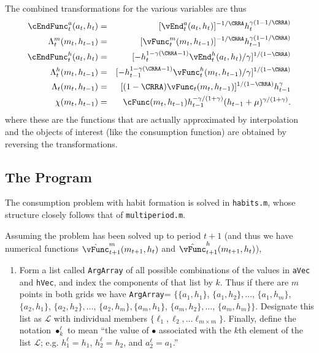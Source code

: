 \documentclass[titlepage]{\econtex}
\begin{document}
{The combined transformations for the various variables are thus
\begin{eqnarray}
        \cEndFunc_{t}^{{a}}({a}_{t},h_{t})       & = & [\vEnd_{t}^{{a}}({a}_{t},h_{t})]^{-1/\CRRA} h_{t}^{\gamma(1-1/\CRRA)} \label{eq:vEndstransform} \\
        \Lambda_{t}^{m}({m}_{t},h_{t-1})  & = & [{\vFunc}_{t}^{m}({m}_{t},h_{t-1})]^{-1/\CRRA} h_{t-1}^{\gamma(1-1/\CRRA)} \label{eq:vxtransform} \\
        \cEndFunc_{t}^{h}({a}_{t},h_{t})       & = &
        [-h_{t}^{1-\gamma(\CRRA-1)}\vEnd_{t}^{h}({a}_{t},h_{t})/\gamma]^{1/(1-\CRRA)}  \label{eq:vEndhtransform}
\\      \Lambda_{t}^{h}({m}_{t},h_{t-1})  & = & [-h_{t-1}^{1-\gamma(\CRRA-1)}{\vFunc}_{t}^{h}({m}_{t},h_{t-1})/\gamma]^{1/(1-\CRRA)} \label{eq:vhtransform}
\\      \Lambda_{t}({m}_{t},h_{t-1})      & = & [(1-\CRRA)
{\vFunc}_{t}({m}_{t},h_{t-1})]^{1/(1-\CRRA)} h_{t-1}^{\gamma}\label{eq:vtransform}
\\  \chi({m}_{t},h_{t-1})      & = & \cFunc({m}_{t},h_{t-1})h_{t-1}^{-\gamma/(1+\gamma)}(h_{t-1}+\mu)^{\gamma/(1+\gamma)}.
\end{eqnarray}
where these are the functions that are actually approximated by
interpolation and the objects of interest (like the consumption
function) are obtained by reversing the transformations.

\hypertarget{The-Program}{}
\subsection{The Program}
The consumption problem with habit formation is solved in
\texttt{habits.m}, whose structure closely follows that of
\texttt{multiperiod.m}.

Assuming the problem has been solved up to period $t+1$ (and thus we
have numerical functions $\hat{\vFunc}_{t+1}^{m}({m}_{t+1},h_{t})$ and
$\hat{\vFunc}_{t+1}^{h}({m}_{t+1},h_{t})$),
\begin{enumerate}

\item Form a list called \texttt{ArgArray} of all possible
combinations of the values in \texttt{aVec} and
\texttt{hVec}, and index the components of that list by $k$.  Thus
if there are $m$ points in both grids we have \texttt{ArgArray}=
$\{\{{a}_{1},h_{1}\}$, $\{{a}_{1},h_{2}\},\ldots$,
$\{{a}_{1},h_{m}\}$, $\{{a}_{2},h_{1}\}$,
$\{{a}_{2},h_{2}\},\ldots$, $\{{a}_{2},h_{m}\},
\{{a}_{m},h_{1}\}$, $\{{a}_{m},h_{2}\},\ldots$,
$\{{a}_{m},h_{m}\}\}$.  Designate this list as $\mathcal{L}$
with individual members $\{\ell_{1}, \ell_{2}, \ldots \ell_{m \times
m}\}$.  Finally, define the notation $\bullet^{\ell}_{k}$ to mean
``the value of $\bullet$ associated with the $k$th element of the
list $\mathcal{L}$; e.g. $h^{\ell}_{1} = h_{1}$, $h^{\ell}_{2} =
h_{2}$, and ${a}^{\ell}_{2}={a}_{1}$.''


\end{enumerate}}
\end{document}
